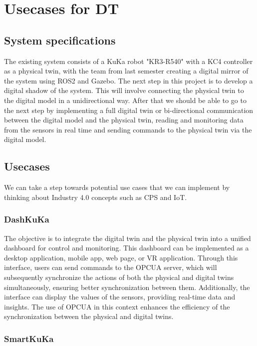 \section{Usecases for DT}

\subsection{System specifications}

The existing system consists of a KuKa robot "KR3-R540" with a KC4 controller as a physical twin, with the team from last semester creating a digital mirror of the system using ROS2 and Gazebo.
The next step in this project is to develop a digital shadow of the system. This will involve connecting the physical twin to the digital model in a unidirectional way.
After that we should be able to go to the next step by implementing a full digital twin or bi-directional communication between the digital model and the physical twin, 
reading and monitoring data from the sensors in real time and sending commands to the physical twin via the digital model. 

\subsection{Usecases}

We can take a step towards potential use cases that we can implement by thinking about Industry 4.0 concepts such as CPS and IoT.

\subsubsection{DashKuKa}
The objective is to integrate the digital twin and the physical twin into a 
unified dashboard for control and monitoring. This dashboard can be implemented 
as a desktop application, mobile app, web page, or VR application. 
Through this interface, users can send commands to the OPCUA server, 
which will subsequently synchronize the actions of both the physical and digital 
twins simultaneously, ensuring better synchronization between them.
Additionally, the interface can display the values of the sensors, providing real-time data and insights. 
The use of OPCUA in this context enhances the efficiency of the synchronization 
between the physical and digital twins.

\subsubsection{SmartKuKa}

